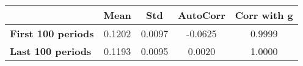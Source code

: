 \begin{tiny}\begin{tabular}{|l|c|c|c|c|}
\hline
&\textbf{Mean}&\textbf{Std}&\textbf{AutoCorr}&\textbf{Corr with g}\\\hline
\textbf{First 100 periods}&0.1202&0.0097&-0.0625&0.9999\\\hline
\textbf{Last 100 periods}&0.1193&0.0095&0.0020&1.0000\\\hline
\end{tabular}
\end{tiny}